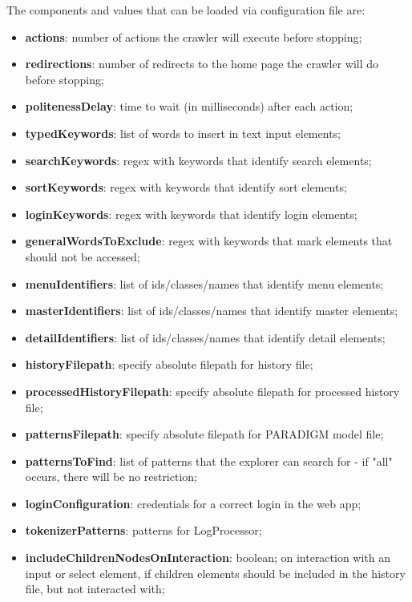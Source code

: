 \documentclass[conference]{IEEEtran}
\begin{document}
The components and values that can be loaded via configuration file are: 
\begin{itemize}
\item[] \textbf{actions}: number of actions the crawler will execute before stopping;
\item[] \textbf{redirections}: number of redirects to the home page the crawler will do before stopping; 
\item[] \textbf{politenessDelay}: time to wait (in milliseconds) after each action;
\item[] \textbf{typedKeywords}: list of words to insert in text input elements;
\item[] \textbf{searchKeywords}: regex with keywords that identify search elements;
\item[] \textbf{sortKeywords}: regex with keywords that identify sort elements;
\item[] \textbf{loginKeywords}: regex with keywords that identify login elements;
\item[] \textbf{generalWordsToExclude}: regex with keywords that mark elements that should not be accessed;
\item[] \textbf{menuIdentifiers}: list of ids/classes/names that identify menu elements;
\item[] \textbf{masterIdentifiers}: list of ids/classes/names that identify master elements;
\item[] \textbf{detailIdentifiers}: list of ids/classes/names that identify detail elements;
\item[] \textbf{historyFilepath}: specify absolute filepath for history file;
\item[] \textbf{processedHistoryFilepath}: specify absolute filepath for processed history file;
\item[] \textbf{patternsFilepath}: specify absolute filepath for PARADIGM model file;
\item[] \textbf{patternsToFind}: list of patterns that the explorer can search for - if "all" occurs, there will be no restriction;
\item[] \textbf{loginConfiguration}: credentials for a correct login in the web app;		
\item[] \textbf{tokenizerPatterns}: patterns for LogProcessor;
\item[] \textbf{includeChildrenNodesOnInteraction}: boolean; on interaction with an input or select element, if children elements should be included  in the history file, but not interacted with;
\end{itemize}
\end{document}

